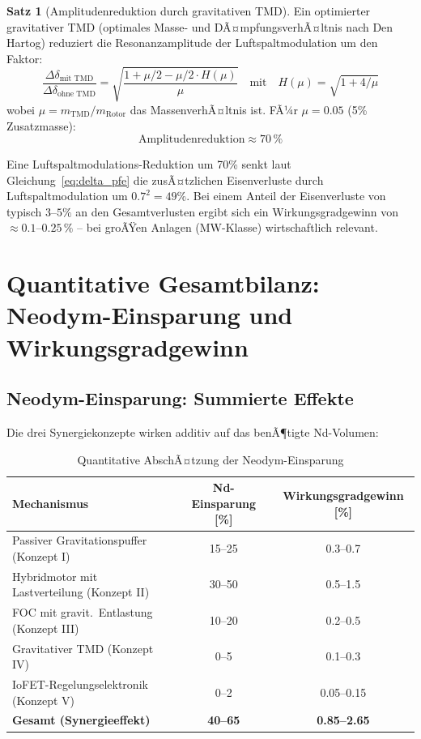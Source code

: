 ﻿\documentclass[12pt, a4paper]{report}
\theoremstyle{definition}
\newtheorem{theorem}{Satz}[section]
\theoremstyle{remark}
\begin{document}
\begin{theorem}[Amplitudenreduktion durch gravitativen TMD]
  \label{thm:TMD}
  Ein optimierter gravitativer TMD (optimales Masse- und DÃ¤mpfungsverhÃ¤ltnis
  nach Den Hartog) reduziert die Resonanzamplitude der Luftspaltmodulation um den
  Faktor:
  \begin{equation}
    \frac{\Delta\delta_{\text{mit TMD}}}{\Delta\delta_{\text{ohne TMD}}}
    = \sqrt{\frac{1+\mu/2 - \mu/2\cdot H(\mu)}{\mu}}
    \quad\text{mit}\quad
    H(\mu) = \sqrt{1 + 4/\mu}
    \label{eq:TMD_amplitudenred}
  \end{equation}
  wobei $\mu = m_\text{TMD}/m_{\text{Rotor}}$ das MassenverhÃ¤ltnis ist.
  FÃ¼r $\mu = 0.05$ (5\% Zusatzmasse):
  \begin{equation}
    \text{Amplitudenreduktion} \approx 70\,\%
    \label{eq:TMD_70}
  \end{equation}
\end{theorem}

Eine Luftspaltmodulations-Reduktion um 70\% senkt laut Gleichung~\eqref{eq:delta_pfe}
die zusÃ¤tzlichen Eisenverluste durch Luftspaltmodulation um $0.7^2 = 49\%$. Bei einem Anteil der
Eisenverluste von typisch $3$--$5\%$ an den Gesamtverlusten ergibt sich ein
Wirkungsgradgewinn von $\approx 0.1$--$0.25\,\%$ -- bei groÃŸen Anlagen (MW-Klasse)
wirtschaftlich relevant.

\section{Quantitative Gesamtbilanz: Neodym-Einsparung und Wirkungsgradgewinn}
\label{ssec:gesamtbilanz}

\subsection{Neodym-Einsparung: Summierte Effekte}

Die drei Synergiekonzepte wirken additiv auf das benÃ¶tigte Nd-Volumen:

\begin{table}
  \centering
  \caption{Quantitative AbschÃ¤tzung der Neodym-Einsparung}
  \label{tab:nd_einsparung}
  \begin{tabular}{lcc}
    \toprule
    \textbf{Mechanismus} & \textbf{Nd-Einsparung [\%]} & \textbf{Wirkungsgrad\-gewinn [\%]} \\
    \midrule
    Passiver Gravitationspuffer (Konzept I)    & 15--25 & 0.3--0.7 \\
    Hybridmotor mit Lastverteilung (Konzept II) & 30--50 & 0.5--1.5 \\
    FOC mit gravit.\ Entlastung (Konzept III)   & 10--20 & 0.2--0.5 \\
    Gravitativer TMD (Konzept IV)               & 0--5   & 0.1--0.3 \\
    IoFET-Regelungselektronik (Konzept V)       & 0--2   & 0.05--0.15 \\
    \midrule
    \textbf{Gesamt (Synergieeffekt)}            & \textbf{40--65} & \textbf{0.85--2.65} \\
    \bottomrule
  \end{tabular}
\end{table}
\end{document}
